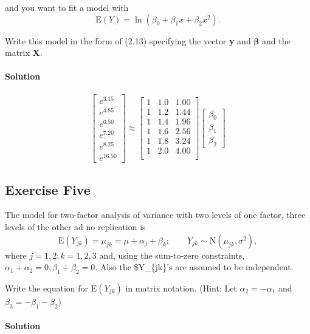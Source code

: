 \documentclass[]{article}
\let\oldparagraph\paragraph
\renewcommand{\paragraph}[1]{\oldparagraph{#1}\mbox{}}
\begin{document}
and you want to fit a model with \[
  \text{E}(Y) = \ln(\beta_0 + \beta_1x + \beta_2x^2).
  \]

Write this model in the form of (2.13) specifying the vector \textbf{y}
and \(\mathbf{\beta}\) and the matrix \textbf{X}.

\paragraph{Solution}\label{solution-2}

\[\begin{bmatrix}
e^{3.15}\\e^{4.85}\\e^{6.50}\\e^{7.20}\\e^{8.25}\\e^{16.50}
\end{bmatrix} \approx \begin{bmatrix}
1 & 1.0 & 1.00\\
1 & 1.2 & 1.44\\
1 & 1.4 & 1.96\\
1 & 1.6 & 2.56\\
1 & 1.8 & 3.24\\
1 & 2.0 & 4.00\\
\end{bmatrix}\begin{bmatrix}
\beta_0\\
\beta_1\\
\beta_2
\end{bmatrix}
\]

\subsection{Exercise Five}\label{exercise-five}

The model for two-factor analysis of variance with two levels of one
factor, three levels of the other ad no replication is \[
  \text{E}(Y_{jk}) = \mu_{jk} = \mu + \alpha_j + \beta_{k}; \quad \quad Y_{jk} \sim \text{N}(\mu_{jk}, \sigma^2),
  \] where \(j = 1,2; k = 1,2,3\) and, using the sum-to-zero
constraints, \(\alpha_1 + \alpha_2 = 0, \beta_1 + \beta_2 = 0\). Also
the \$Y\_\{jk\}'s are assumed to be independent.

Write the equation for \(\text{E}(Y_{jk})\) in matrix notation. (Hint:
Let \(\alpha_2 = -\alpha_1\) and \(\beta_3 = -\beta_1 - \beta_2\))

\paragraph{Solution}\label{solution-3}
\end{document}

